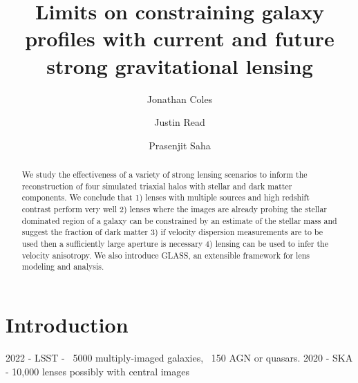 \documentclass[onecolumn,galley]{mn2e}
\title{Limits on constraining galaxy profiles with current and future strong gravitational lensing}
\author{%
Jonathan Coles 
\and 
Justin Read
\and 
Prasenjit Saha 
}
\begin{document}
\maketitle

\tableofcontents

\begin{abstract}
We study the effectiveness of a variety of strong lensing scenarios to inform
the reconstruction of four simulated triaxial halos with stellar and dark
matter components. We conclude that 
1) lenses with multiple sources and high redshift contrast perform very well
2) lenses where the images are already probing the stellar dominated region 
   of a galaxy can be constrained by an estimate of the stellar mass and
   suggest the fraction of dark matter
3) if velocity dispersion measurements are to be used then a sufficiently large aperture 
   is necessary
4) lensing can be used to infer the velocity anisotropy.
We also introduce GLASS, an extensible framework for lens modeling and analysis.


\end{abstract}
\section{Introduction}

2022 - LSST - ~5000 multiply-imaged galaxies, ~150 AGN or quasars.
2020 - SKA - 10,000 lenses possibly with central images
\end{document}
